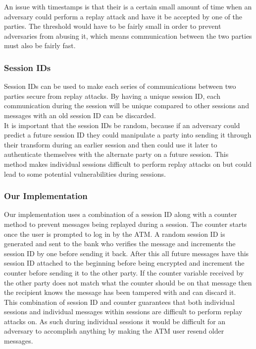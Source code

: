 			An issue with timestamps is that their is a certain small amount of time when an adversary could perform a replay attack and have it be accepted by one of the parties. The threshold would have to be fairly small in order to prevent adversaries from abusing it, which means communication between the two parties must also be fairly fast.

		\subsubsection{Session IDs}\label{sec:replaysessions}
			Session IDs can be used to make each series of communications between two parties secure from replay attacks. By having a unique session ID, each communication during the session will be unique compared to other sessions and messages with an old session ID can be discarded. \\

			It is important that the session IDs be random, because if an adversary could predict a future session ID they could manipulate a party into sending it through their transform during an earlier session and then could use it later to authenticate themselves with the alternate party on a future session. This method makes individual sessions difficult to perform replay attacks on but could lead to some potential vulnerabilities during sessions.

		\subsubsection{Our Implementation}\label{sec:replayimplementation}
			Our implementation uses a combination of a session ID along with a counter method to prevent messages being replayed during a session. The counter starts once the user is prompted to log in by the ATM. A random session ID is generated and sent to the bank who verifies the message and increments the session ID by one before sending it back. After this all future messages have this session ID attached to the beginning before being encrypted and increment the counter before sending it to the other party. If the counter variable received by the other party does not match what the counter should be on that message then the recipient knows the message has been tampered with and can discard it. \\

			This combination of session ID and counter guarantees that both individual sessions and individual messages within sessions are difficult to perform replay attacks on. As such during individual sessions it would be difficult for an adversary to accomplish anything by making the ATM user resend older messages. 

